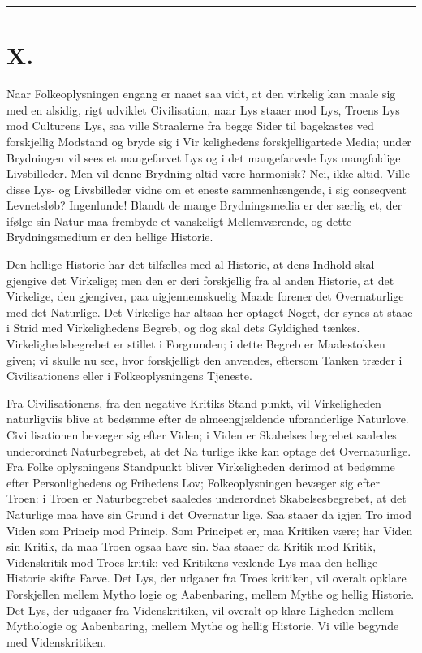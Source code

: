 \documentclass[12pt]{book}
\newcommand{\opage}[1]{\marginnote{\footnotesize\textit{[#1]}}}
\begin{document}
\begin{center}\rule{3cm}{0.4pt}\end{center}

\chapter*{X.}
\label{ch:x}
\opage{154}\setcounter{footnote}{0}%
Naar Folkeoplysningen engang er naaet saa vidt, at den
virkelig kan maale sig med en alsidig, rigt udviklet
Civilisation, naar Lys staaer mod Lys, Troens Lys mod
Culturens Lys, saa ville Straalerne fra begge Sider til\-%
bagekastes ved forskjellig Modstand og bryde sig i Vir\-%
kelighedens forskjelligartede Media; under Brydningen
vil sees et mangefarvet Lys og i det mangefarvede Lys
mangfoldige Livsbilleder. Men vil denne Brydning altid
være harmonisk? Nei, ikke altid. Ville disse Lys- og
Livsbilleder vidne om et eneste sammenhængende, i sig
conseqvent Levnetsløb? Ingenlunde! Blandt de mange
Brydningsmedia er der særlig et, der ifølge sin Natur
maa frembyde et vanskeligt Mellemværende, og dette
Brydningsmedium er den hellige Historie.

Den hellige Historie har det tilfælles med al Historie,
at dens Indhold skal gjengive det Virkelige; men den
er deri forskjellig fra al anden Historie, at det Virkelige,
den gjengiver, paa uigjennemskuelig Maade forener det
Overnaturlige med det Naturlige. Det Virkelige har
altsaa her optaget Noget, der synes at staae i Strid med
Virkelighedens Begreb, og dog skal dets Gyldighed
tænkes. Virkelighedsbegrebet er stillet i Forgrunden;
i dette Begreb er Maalestokken given; vi skulle nu see,
\opage{155}\setcounter{footnote}{0}%
hvor forskjelligt den anvendes, eftersom Tanken træder
i Civilisationens eller i Folkeoplysningens Tjeneste.

Fra Civilisationens, fra den negative Kritiks Stand\-%
punkt, vil Virkeligheden naturligviis blive at bedømme
efter de almeengjældende uforanderlige Naturlove. Civi\-%
lisationen bevæger sig efter Viden; i Viden er Skabelses\-%
begrebet saaledes underordnet Naturbegrebet, at det Na\-%
turlige ikke kan optage det Overnaturlige. Fra Folke\-%
oplysningens Standpunkt bliver Virkeligheden derimod
at bedømme efter Personlighedens og Frihedens Lov;
Folkeoplysningen bevæger sig efter Troen: i Troen er
Naturbegrebet saaledes underordnet Skabelsesbegrebet,
at det Naturlige maa have sin Grund i det Overnatur\-%
lige. Saa staaer da igjen Tro imod Viden som Princip
mod Princip. Som Principet er, maa Kritiken være;
har Viden sin Kritik, da maa Troen ogsaa have sin. Saa
staaer da Kritik mod Kritik, Videnskritik mod Troes\-%
kritik: ved Kritikens vexlende Lys maa den hellige
Historie skifte Farve. Det Lys, der udgaaer fra Troes\-%
kritiken, vil overalt opklare Forskjellen mellem Mytho\-%
logie og Aabenbaring, mellem Mythe og hellig Historie.
Det Lys, der udgaaer fra Videnskritiken, vil overalt op\-%
klare Ligheden mellem Mythologie og Aabenbaring,
mellem Mythe og hellig Historie. Vi ville begynde med
Videnskritiken.
\end{document}

